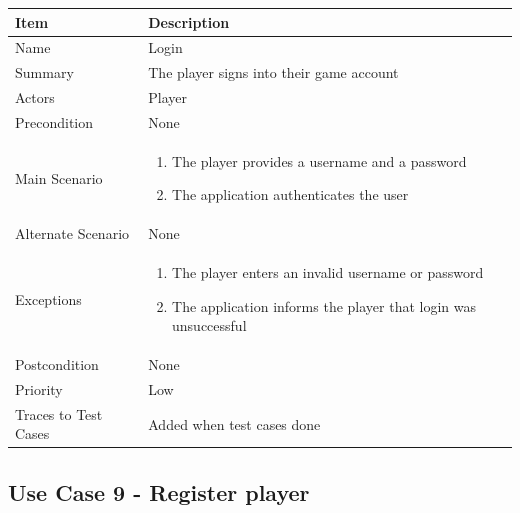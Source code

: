 \documentclass[12pt]{article}
\begin{document}
\begin{center}
\setlength{\tabcolsep}{18pt}
\renewcommand{\arraystretch}{1.3}
\begin{tabular}{ |p{3.4cm}|p{10cm}| }
    \hline
    
   \textbf{Item} & \textbf{Description} \\
    \hline
    Name & Login \\
    \hline
    Summary & The player signs into their game account \\
    \hline
    Actors & Player \\
    \hline
    Precondition & None \\
    \hline
    Main Scenario &     
    \vspace*{-0.1in}
    \begin{enumerate}
        \item The player provides a username and a password
        \item The application authenticates the user
    
       
    \end{enumerate}  \\
    \hline
    Alternate Scenario & None \\
    \hline
    Exceptions & 
    \vspace*{-0.1in}
    \begin{enumerate}
        \item The player enters an invalid username or password
        \item The application informs the player that login was unsuccessful
    \end{enumerate}  \\
    \hline
    Postcondition & None \\
    \hline
    Priority & Low  \\
    \hline
    Traces to Test Cases & Added when test cases done  \\
    \hline
\end{tabular}
\end{center}

\newpage


\subsection{Use Case 9 - Register player}
\end{document}
